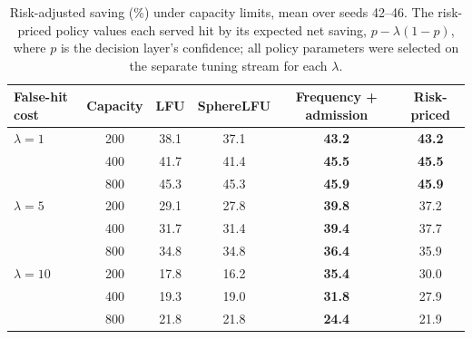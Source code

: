 \begin{table}[htbp]
\centering
\caption{Risk-adjusted saving (\%) under capacity limits, mean over seeds 42--46. The risk-priced policy values each served hit by its expected net saving, $p-\lambda(1-p)$, where $p$ is the decision layer's confidence; all policy parameters were selected on the separate tuning stream for each $\lambda$.}
\label{tab:admission_risk}
\footnotesize
\begin{tabular}{lccccc}
\toprule
False-hit cost & Capacity & LFU & SphereLFU & Frequency + admission & Risk-priced \\
\midrule
$\lambda=1$ & 200 & 38.1 & 37.1 & \textbf{43.2} & \textbf{43.2} \\
 & 400 & 41.7 & 41.4 & \textbf{45.5} & \textbf{45.5} \\
 & 800 & 45.3 & 45.3 & \textbf{45.9} & \textbf{45.9} \\
\midrule
$\lambda=5$ & 200 & 29.1 & 27.8 & \textbf{39.8} & 37.2 \\
 & 400 & 31.7 & 31.4 & \textbf{39.4} & 37.7 \\
 & 800 & 34.8 & 34.8 & \textbf{36.4} & 35.9 \\
\midrule
$\lambda=10$ & 200 & 17.8 & 16.2 & \textbf{35.4} & 30.0 \\
 & 400 & 19.3 & 19.0 & \textbf{31.8} & 27.9 \\
 & 800 & 21.8 & 21.8 & \textbf{24.4} & 21.9 \\
\bottomrule
\end{tabular}
\end{table}

\begin{table}[htbp]
\centering
\caption{False-hit rate and hit precision with and without admission control (C2 serving, mean over seeds 42--46).}
\label{tab:admission_precision}
\end{table}

